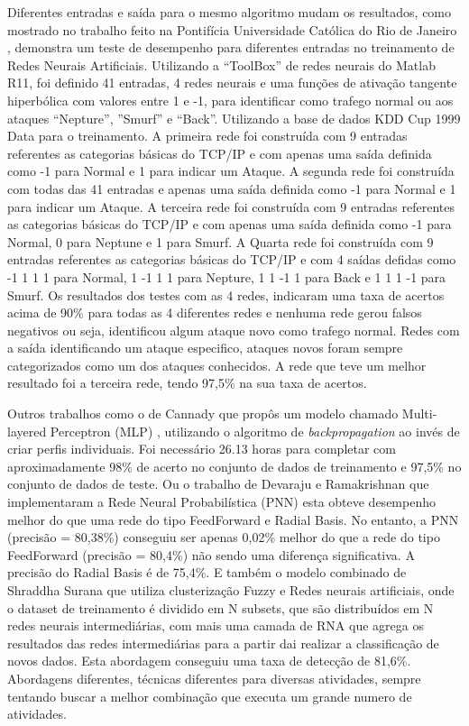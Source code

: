 Diferentes entradas e saída para o mesmo algoritmo mudam os resultados, como mostrado no trabalho feito na Pontifícia Universidade Católica do Rio de Janeiro \cite{RenatoMaia}, demonstra um teste de desempenho para diferentes entradas no treinamento de Redes Neurais Artificiais. Utilizando a “ToolBox” de redes neurais do Matlab R11, foi definido 41 entradas, 4 redes neurais e uma funções de ativação tangente hiperbólica com valores entre 1 e -1, para identificar como trafego normal ou aos ataques “Nepture”, ”Smurf” e “Back”. Utilizando a base de dados KDD Cup 1999 Data\cite{KDDCup99} para o treinamento. 
A primeira rede foi construída com 9 entradas referentes as categorias básicas do TCP/IP e com apenas uma saída definida como -1 para Normal e 1 para indicar um Ataque.
A segunda rede foi construída com todas das 41 entradas e apenas uma saída definida como -1 para Normal e 1 para indicar um Ataque.
A terceira rede foi construída com 9 entradas referentes as categorias básicas do TCP/IP e com apenas uma saída definida como -1 para Normal, 0 para Neptune e 1 para Smurf.
A Quarta rede foi construída com 9 entradas referentes as categorias básicas do TCP/IP e com 4 saídas defidas como -1 1 1 1 para Normal, 1 -1 1 1 para Nepture, 1 1 -1 1 para Back e 1 1 1 -1 para Smurf.
Os resultados dos testes com as 4 redes, indicaram uma taxa de acertos acima de 90\% para todas as 4 diferentes redes e nenhuma rede gerou falsos negativos ou seja, identificou algum ataque novo como trafego normal. Redes com a saída identificando um ataque especifico, ataques novos foram sempre categorizados como um dos ataques conhecidos. A rede que teve um melhor resultado foi a terceira rede, tendo 97,5\% na sua taxa de acertos.

Outros trabalhos como o de Cannady que propôs um modelo chamado Multi-layered Perceptron (MLP) \cite{Cannady}, utilizando o algoritmo de \textit{backpropagation} ao invés de criar perfis individuais. Foi necessário 26.13 horas para completar com aproximadamente 98\% de acerto no conjunto de dados de treinamento e 97,5\% no conjunto de dados de teste.
Ou o trabalho de Devaraju e Ramakrishnan que implementaram a Rede Neural Probabilística (PNN) \cite{Devaraju} esta obteve desempenho melhor do que uma rede do tipo FeedForward e Radial Basis. No entanto, a PNN (precisão = 80,38\%) conseguiu ser apenas 0,02\% melhor do que a rede do tipo FeedForward (precisão = 80,4\%) não sendo uma diferença significativa. A precisão do  Radial Basis é de 75,4\%.
E também o modelo combinado de Shraddha Surana \cite{Surana} que utiliza clusterização Fuzzy e Redes neurais artificiais, onde o dataset de treinamento é dividido em N subsets, que são distribuídos em N redes neurais intermediárias, com mais uma camada de RNA que agrega os resultados das redes intermediárias para a partir dai realizar a classificação de novos dados. Esta abordagem conseguiu uma taxa de detecção de 81,6\%.
Abordagens diferentes, técnicas diferentes para diversas atividades, sempre tentando buscar a melhor combinação que executa um grande numero de atividades.
